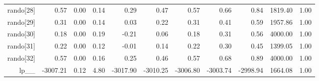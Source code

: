 \begin{table}[ht]
\begin{tabular}{rrrrrrrrrrr}
  rando[28] & 0.57 & 0.00 & 0.14 & 0.29 & 0.47 & 0.57 & 0.66 & 0.84 & 1819.40 & 1.00 \\ 
  rando[29] & 0.31 & 0.00 & 0.14 & 0.03 & 0.22 & 0.31 & 0.41 & 0.59 & 1957.86 & 1.00 \\ 
  rando[30] & 0.18 & 0.00 & 0.19 & -0.21 & 0.06 & 0.18 & 0.31 & 0.56 & 4000.00 & 1.00 \\ 
  rando[31] & 0.22 & 0.00 & 0.12 & -0.01 & 0.14 & 0.22 & 0.30 & 0.45 & 1399.05 & 1.00 \\ 
  rando[32] & 0.57 & 0.00 & 0.16 & 0.25 & 0.46 & 0.57 & 0.68 & 0.89 & 4000.00 & 1.00 \\ 
  lp\_\_ & -3007.21 & 0.12 & 4.80 & -3017.90 & -3010.25 & -3006.80 & -3003.74 & -2998.94 & 1664.08 & 1.00 \\ 
   \hline
\end{tabular}
\label{scalefit_tab}
\end{table}
